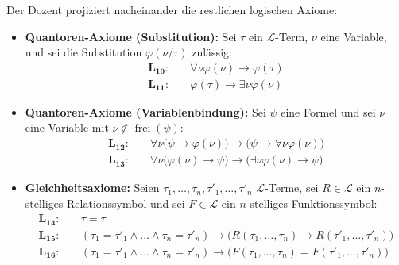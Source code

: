 \begin{meta-note}
Der Dozent projiziert nacheinander die restlichen logischen Axiome:
\begin{itemize}
    \item \textbf{Quantoren-Axiome (Substitution):} Sei $\tau$ ein $\mathcal{L}$-Term, $\nu$ eine Variable, und sei die Substitution $\varphi(\nu/\tau)$ zulässig:
    \begin{align*}
    \mathbf{L_{10}}\colon &\quad \forall\nu\varphi(\nu) \rightarrow \varphi(\tau) \\
    \mathbf{L_{11}}\colon &\quad \varphi(\tau) \rightarrow \exists\nu\varphi(\nu)
    \end{align*}
    \item \textbf{Quantoren-Axiome (Variablenbindung):} Sei $\psi$ eine Formel und sei $\nu$ eine Variable mit $\nu \notin \operatorname{frei}(\psi)$:
    \begin{align*}
    \mathbf{L_{12}}\colon &\quad \forall\nu\bigl(\psi \rightarrow \varphi(\nu)\bigr) \rightarrow \bigl(\psi \rightarrow \forall\nu\varphi(\nu)\bigr) \\
    \mathbf{L_{13}}\colon &\quad \forall\nu\bigl(\varphi(\nu) \rightarrow \psi\bigr) \rightarrow \bigl(\exists\nu\varphi(\nu) \rightarrow \psi\bigr)
    \end{align*}
    \item \textbf{Gleichheitsaxiome:} Seien $\tau_1, \dots, \tau_n, \tau'_1, \dots, \tau'_n$ $\mathcal{L}$-Terme, sei $R \in \mathcal{L}$ ein $n$-stelliges Relationssymbol und sei $F \in \mathcal{L}$ ein $n$-stelliges Funktionssymbol:
    \begin{align*}
    \mathbf{L_{14}}\colon &\quad \tau = \tau \\
    \mathbf{L_{15}}\colon &\quad (\tau_1 = \tau'_1 \wedge \dots \wedge \tau_n = \tau'_n) \rightarrow \bigl(R(\tau_1, \dots, \tau_n) \rightarrow R(\tau'_1, \dots, \tau'_n)\bigr) \\
    \mathbf{L_{16}}\colon &\quad (\tau_1 = \tau'_1 \wedge \dots \wedge \tau_n = \tau'_n) \rightarrow \bigl(F(\tau_1, \dots, \tau_n) = F(\tau'_1, \dots, \tau'_n)\bigr)
    \end{align*}
\end{itemize}
\end{meta-note}

\begin{ai-global-state-checkpoint-invisible-content}
\end{ai-global-state-checkpoint-invisible-content}

